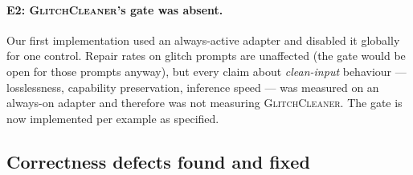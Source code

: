 \documentclass[11pt,a4paper]{article}
\newcommand{\gc}{\textsc{GlitchCleaner}}
\begin{document}
\paragraph{E2: \gc{}'s gate was absent.}
Our first implementation used an always-active adapter and disabled it globally
for one control. Repair rates on glitch prompts are unaffected (the gate would be
open for those prompts anyway), but every claim about \emph{clean-input} behaviour
--- losslessness, capability preservation, inference speed --- was measured on an
always-on adapter and therefore was not measuring \gc{}. The gate is now
implemented per example as specified.

\subsection{Correctness defects found and fixed}
\end{document}
